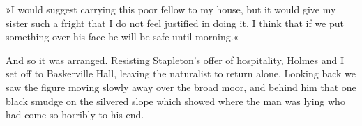 »I would suggest carrying this poor fellow to my house, but it would give my sister such a fright that I do not feel justified in doing it. I think that if we put something over his face he will be safe until morning.«

And so it was arranged. Resisting Stapleton's offer of hospitality, Holmes and I set off to Baskerville Hall, leaving the naturalist to return alone. Looking back we saw the figure moving slowly away over the broad moor, and behind him that one black smudge on the silvered slope which showed where the man was lying who had come so horribly to his end.

